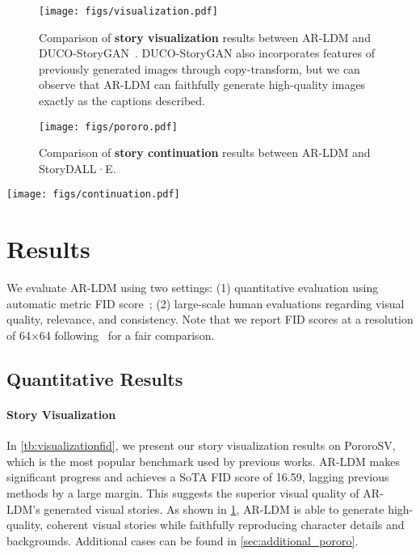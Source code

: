 \documentclass[10pt,twocolumn,letterpaper]{article}
\begin{document}
\begin{figure*}[!th]
\centering
\begin{subfigure}{\linewidth}
    \centering
    \texttt{[image: figs/visualization.pdf]}
    \caption{Comparison of \textbf{story visualization} results between AR-LDM and DUCO-StoryGAN~\cite{ducostorygan}. DUCO-StoryGAN also incorporates features of previously generated images through copy-transform, but we can observe that AR-LDM can faithfully generate high-quality images exactly as the captions described.}
    \label{fig:visualization}
\end{subfigure}
\begin{subfigure}{\linewidth}
    \centering
    \texttt{[image: figs/pororo.pdf]}
    \caption{Comparison of \textbf{story continuation} results between AR-LDM and StoryDALL·E.~\cite{storydalle}}
    \label{fig:pororocontinuation}
\end{subfigure}
\caption{Visual story synthesis results on PororoSV. Note the case in \cref{fig:visualization} and \cref{fig:pororocontinuation} is the same one.}
\label{fig:pororovisandcontinue}
\end{figure*}

\begin{figure*}[!th]
    \centering
    \texttt{[image: figs/continuation.pdf]}
    \caption{Comparison of story continuation results between AR-LDM and StoryDALL·E on FlintstonesSV (upper) and VIST-SIS (lower). Better visual quality, relevance, and consistency can be observed in the visual stories synthesized by AR-LDM.}
    \label{fig:continuation}
\end{figure*}

\section{Results}
We evaluate AR-LDM using two settings: (1) quantitative evaluation using automatic metric FID score~\cite{fid}; (2) large-scale human evaluations regarding visual quality, relevance, and consistency. Note that we report FID scores at a resolution of 64$\times$64 following~\cite{storydalle} for a fair comparison.

\subsection{Quantitative Results}
\paragraph{Story Visualization}
In \cref{tb:visualizationfid}, we present our story visualization results on PororoSV, which is the most popular benchmark used by previous works. AR-LDM makes significant progress and achieves a SoTA FID score of 16.59, lagging previous methods by a large margin. This suggests the superior visual quality of AR-LDM's generated visual stories. As shown in \cref{fig:visualization}, AR-LDM is able to generate high-quality, coherent visual stories while faithfully reproducing character details and backgrounds. Additional cases can be found in \cref{sec:additional_pororo}.
\end{document}
